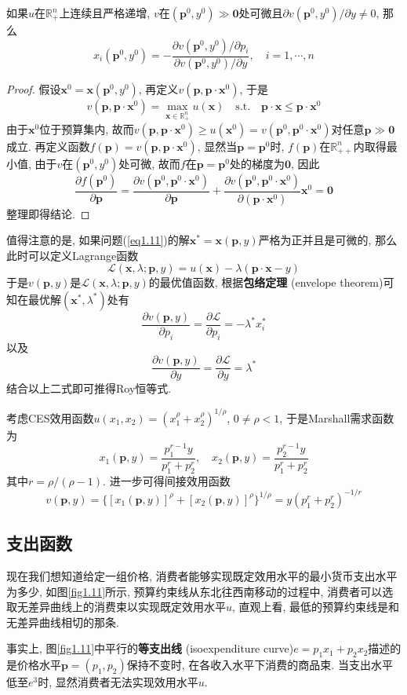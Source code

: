 \documentclass[cn, 12pt, math=mtpro2, bibstyle=apa, blue]{elegantbook}
\newcommand{\R}{\mathbb{R}}
\newcommand{\p}{\mathbf{p}}
\newcommand{\x}{\mathbf{x}}
\begin{document}
\begin{theorem}[Roy恒等式]
  如果$u$在$\R_+^n$上连续且严格递增, $v$在$(\p^0,y^0)\gg\mathbf{0}$处可微且$\partial v(\p^0,y^0)/\partial y\ne0$, 那么
  $$x_i(\p^0,y^0)=-\frac{\partial v(\p^0,y^0)/\partial p_i}{\partial v(\p^0,y^0)/\partial y},\quad i=1,\cdots,n$$
\end{theorem}
\begin{proof}
  假设$\x^0=\x(\p^0,y^0)$, 再定义$v(\p,\p\cdot\x^0)$, 于是
  $$v(\p,\p\cdot\x^0)=\max_{\x\in\R_+^n}u(\x)\quad\text{s.t.}\quad \p\cdot\x\leq \p\cdot\x^0$$
  由于$\x^0$位于预算集内, 故而$v(\p,\p\cdot\x^0)\geq u(\x^0)=v(\p^0,\p^0\cdot\x^0)$对任意$\p\gg\mathbf{0}$成立. 再定义函数$f(\p)=v(\p,\p\cdot\x^0)$, 显然当$\p=\p^0$时, $f(\p)$在$\R_{++}^n$内取得最小值, 由于$v$在$(\p^0,y^0)$处可微, 故而$f$在$\p=\p^0$处的梯度为$\mathbf{0}$, 因此
  $$\frac{\partial f(\p^0)}{\partial \p}=\frac{\partial v(\p^0,\p^0\cdot\x^0)}{\partial \p}+\frac{\partial v(\p^0,\p^0\cdot\x^0)}{\partial (\p\cdot\x^0)}\x^0=\mathbf{0}$$
  整理即得结论.
\end{proof}
值得注意的是, 如果问题(\ref{eq1.11})的解$\x^\ast=\x(\p,y)$严格为正并且是可微的, 那么此时可以定义Lagrange函数
$$\mathcal{L}(\x,\lambda;\p,y)=u(\x)-\lambda(\p\cdot\x-y)$$
于是$v(\p,y)$是$\mathcal{L}(\x,\lambda;\p,y)$的最优值函数, 根据\textbf{包络定理} (envelope theorem)可知在最优解$(\x^\ast,\lambda^\ast)$处有
$$\frac{\partial v(\p,y)}{\partial p_i}=\frac{\partial \mathcal{L}}{\partial p_i}=-\lambda^\ast x_i^\ast$$
以及
$$\frac{\partial v(\p,y)}{\partial y}=\frac{\partial \mathcal{L}}{\partial y}=\lambda^\ast$$
结合以上二式即可推得Roy恒等式.

\begin{example}
考虑CES效用函数$u(x_1,x_2)=(x_1^\rho+x_2^\rho)^{1/\rho}$, $0\neq\rho<1$, 于是Marshall需求函数为
$$x_1(\p,y)=\frac{p_1^{r-1}y}{p_1^r+p_2^r},\quad x_2(\p,y)=\frac{p_2^{r-1}y}{p_1^r+p_2^r}$$
其中$r=\rho/(\rho-1)$. 进一步可得间接效用函数
$$v(\p,y)=\{[x_1(\p,y)]^\rho+[x_2(\p,y)]^\rho\}^{1/\rho}=y(p_1^r+p_2^r)^{-1/r}$$
\end{example}
\subsection{支出函数}
现在我们想知道给定一组价格, 消费者能够实现既定效用水平的最小货币支出水平为多少, 如图\ref{fig1.11}所示, 预算约束线从东北往西南移动的过程中, 消费者可以选取无差异曲线上的消费束以实现既定效用水平$u$, 直观上看, 最低的预算约束线是和无差异曲线相切的那条.

事实上, 图\ref{fig1.11}中平行的\textbf{等支出线 }(isoexpenditure curve)$e=p_1x_1+p_2x_2$描述的是价格水平$\p=(p_1,p_2)$保持不变时, 在各收入水平下消费的商品束. 当支出水平低至$e^3$时, 显然消费者无法实现效用水平$u$.
\end{document}
